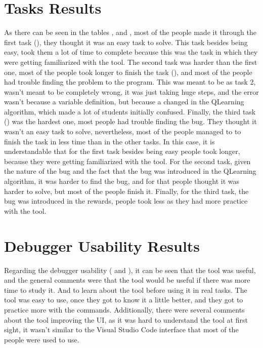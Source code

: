 \section{Tasks Results}
\label{sec:tasks-results}
As there can be seen in the tables ,  and 
, most of the people made it through the first task (),
they thought it was an easy task to solve. This task besides being easy, took them a lot of 
time to complete because this was the task in which they were getting familiarized with the 
tool. The second task was harder than the first one, most of the people took longer to finish the 
task (), and most of the people had trouble finding the problem to the program. 
This was meant to be as task 2, wasn't meant to be completely wrong, it was just taking huge 
steps, and the error wasn't because a variable definition, but because a changed in the QLearning
algorithm, which made a lot of students initially confused. Finally, the third task () was the hardest 
one, most people had trouble finding the bug. They thought it wasn't an easy task to solve, 
nevertheless, most of the people managed to to finish the task in less time than in the other tasks. 
In this case, it is understandable that for the first task besides being 
easy people took longer, because they were getting familiarized with the tool. For the second task,
given the nature of the bug and the fact that the bug was introduced in the QLearning algorithm, 
it was harder to find the bug, and for that people thought it was harder to solve, but
most of the people finish it. Finally, for the third task, the bug was introduced in the rewards,
people took less as they had more practice with the tool.



\section{Debugger Usability Results}
\label{sec:usability}

Regarding the debugger usability ( and ), it can 
be seen that the tool was useful,
and the general comments were that the tool would be useful if there was more time to study it. 
And to learn about the tool before using it in real tasks. The 
tool was easy to use, once they got to know it a little better, and they got to practice more with the commands.
Additionally, there were several comments about the tool improving the UI,
as it was hard to understand the tool at first sight, it wasn't similar to the Visual Studio Code 
interface that most of the people were used to use.

